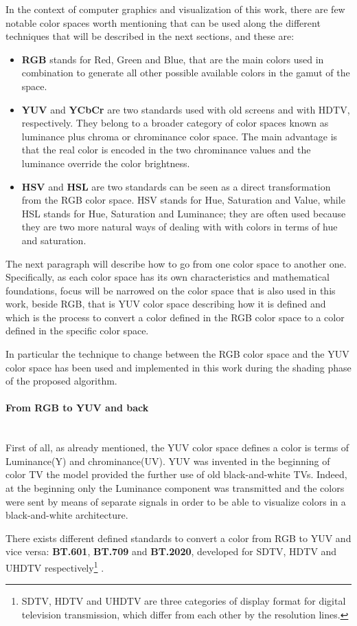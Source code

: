 \documentclass[12pt,a4paper]{extarticle}
\newcommand{\myparagraph}[1]{\paragraph{#1}\mbox{}\\}
\begin{document}
In the context of computer graphics and visualization of this work, there are few notable color spaces worth mentioning that can be used along the different techniques that will be described in the next sections, and these are:
\begin{itemize}
\item \textbf{RGB} stands for Red, Green and Blue, that are the main colors used in combination to generate all other possible available colors in the gamut of the space.
\item \textbf{YUV} and \textbf{YCbCr} are two standards used with old screens and with HDTV, respectively. They belong to a broader category of color spaces known as luminance plus chroma or chrominance color space. The main advantage is that the real color is encoded in the two chrominance values and the luminance override the color brightness.
\item \textbf{HSV} and \textbf{HSL} are two standards can be seen as a direct transformation from the RGB color space. HSV stands for Hue, Saturation and Value, while HSL stands for Hue, Saturation and Luminance; they are often used because they are two more natural ways of dealing with with colors in terms of hue and saturation.
\end{itemize}
The next paragraph will describe how to go from one color space to another one. Specifically, as each color space has its own characteristics and mathematical foundations, focus will be narrowed on the color space that is also used in this work, beside RGB, that is YUV color space describing how it is defined and which is the process to convert a color defined in the RGB color space to a color defined in the specific color space.


In particular the technique to change between the RGB color space and the YUV color space has been used and implemented in this work during the shading phase of the proposed algorithm.
\myparagraph{From RGB to YUV and back} First of all, as already mentioned, the YUV color space defines a color is terms of Luminance(Y) and chrominance(UV). YUV was invented in the beginning of color TV the model provided the further use of old black-and-white TVs. Indeed, at the beginning only the Luminance component was transmitted and the colors were sent by means of separate signals in order to be able to visualize colors in a black-and-white architecture.


There exists different defined standards to convert a color from RGB to YUV and vice versa: \textbf{BT.601}, \textbf{BT.709} and \textbf{BT.2020}, developed for SDTV, HDTV and  UHDTV respectively\footnote{SDTV, HDTV and UHDTV are three categories of display format for digital television transmission, which differ from each other by the resolution lines.} \cite{wiki_yuv}.
\end{document}
